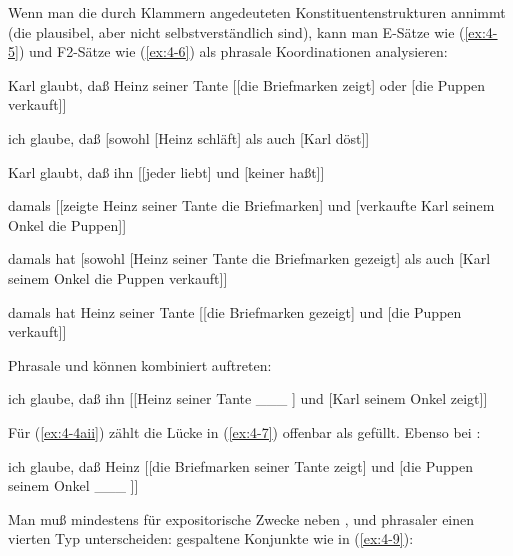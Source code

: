 \documentclass[output=paper]{langsci/langscibook}
\begin{document}
Wenn man die durch Klammern angedeuteten Konstituentenstrukturen annimmt (die plausibel, aber nicht selbstverständlich sind), kann man E-Sätze wie (\ref{ex:4-5}) und F2-Sätze wie (\ref{ex:4-6}) als phrasale Koordinationen analysieren:

\begin{exe}
\ex
\label{ex:4-5}
\begin{xlist}
\ex%
\label{ex:4-5a}
 Karl glaubt, daß Heinz seiner Tante [[die Briefmarken zeigt] oder [die Puppen verkauft]]

\ex%
\label{ex:4-5b}
 ich glaube, daß [sowohl [Heinz schläft] als auch [Karl döst]]

\ex%
\label{ex:4-5c}
 Karl glaubt, daß ihn [[jeder liebt] und [keiner haßt]]
\end{xlist}

\ex
\label{ex:4-6}
\begin{xlist}
\ex%
\label{ex:4-6a}
 damals [[zeigte Heinz seiner Tante die Briefmarken] und [verkaufte Karl seinem Onkel die Puppen]]

\ex%
\label{ex:4-6b}
 damals hat [sowohl [Heinz seiner Tante die Briefmarken gezeigt] als auch [Karl seinem Onkel die Puppen verkauft]]

\ex%
\label{ex:4-6c}
 damals hat Heinz seiner Tante [[die Briefmarken gezeigt] und [die Puppen verkauft]]
\end{xlist}
\end{exe}
Phrasale  und  können kombiniert auftreten:

\begin{exe}
\ex%
\label{ex:4-7}
ich glaube, daß ihn [[Heinz seiner Tante \_\_\_ ] und [Karl seinem Onkel zeigt]]
\end{exe}
Für (\ref{ex:4-4aii}) zählt die Lücke in (\ref{ex:4-7}) offenbar als gefüllt. Ebenso bei :

\begin{exe}
\ex%
\label{ex:4-8}
 ich glaube, daß Heinz [[die Briefmarken seiner Tante zeigt] und [die Puppen seinem Onkel \_\_\_ ]]
\end{exe}
\ssubsection{}%
\label{subsec:4-1-4}
Man muß mindestens für expositorische Zwecke neben ,  und phrasaler  einen vierten Typ unterscheiden: gespaltene Konjunkte wie in (\ref{ex:4-9}):
\end{document}
